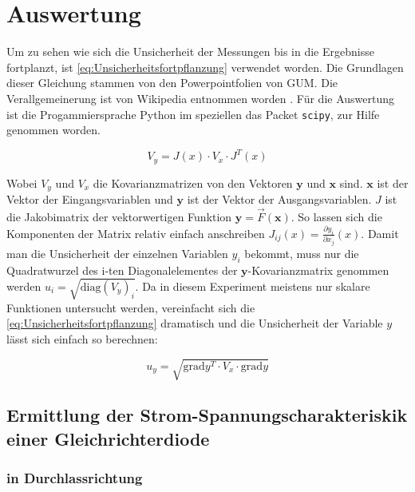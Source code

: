 \documentclass[11pt,ngerman]{scrartcl}
\begin{document}
\section{Auswertung}

\noindent Um zu sehen wie sich die Unsicherheit der Messungen bis in die Ergebnisse
fortplanzt, ist \autoref{eq:Unsicherheitsfortpflanzung} verwendet worden.
Die Grundlagen dieser Gleichung stammen von den Powerpointfolien von
GUM.\cite{WolfgangKessel2004} Die Verallgemeinerung ist von Wikipedia entnommen
worden \cite{2020Fehler}.
Für die Auswertung ist die Progammiersprache Python im speziellen das
Packet \verb#scipy#, zur Hilfe genommen worden.

\begin{equation}
	\label{eq:Unsicherheitsfortpflanzung}
	V_y = J(x) \cdot V_x \cdot J^{T}(x)
\end{equation}

\noindent Wobei $V_y$ und $V_x$ die Kovarianzmatrizen von den Vektoren $\bm{y}$ und $\bm{x}$ sind.
$\bm{x}$ ist der Vektor der Eingangsvariablen und $\bm{y}$ ist der Vektor der Ausgangsvariablen.
$J$ ist die Jakobimatrix der vektorwertigen Funktion $\bm{y} = \vec{F}(\bm{x})$.
So lassen sich die Komponenten der Matrix relativ einfach anschreiben $J_{ij}(x) = \frac{\partial{y_i}}{\partial{x_j}}(x)$.
Damit man die Unsicherheit der einzelnen Variablen $y_i$ bekommt, muss nur die Quadratwurzel des i-ten Diagonalelementes der
$\bm{y}$-Kovarianzmatrix genommen werden $u_i= \sqrt{\mathrm{diag}(V_y)_i}$.
Da in diesem Experiment meistens nur skalare Funktionen untersucht werden, vereinfacht
sich die \autoref{eq:Unsicherheitsfortpflanzung} dramatisch und die Unsicherheit
der Variable $y$ lässt sich einfach so berechnen:

\begin{equation}
	\label{eq:graduncentainty}
	u_y = \sqrt{\mathrm{grad} y^T \cdot V_x \cdot \mathrm{grad} y}
\end{equation}

\newpage

\subsection{Ermittlung der Strom-Spannungscharakteriskik einer Gleichrichterdiode}

\subsubsection{in Durchlassrichtung}
\end{document}
